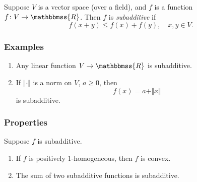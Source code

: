 \documentclass[12pt]{article}
\newcommand{\R}{\mathbbmss{R}}
\begin{document}
Suppose $V$ is a vector space (over a field), and $f$ is a 
function $f\colon V\to \R$. Then $f$ is \emph{subadditive} if
$$
   f(x+y) \le f(x) + f(y), \quad x,y\in V.
$$

\subsubsection*{Examples}
\begin{enumerate}
\item Any linear function $V\to \R$ is subadditive.
\item If $\Vert\cdot \Vert$ is a norm on $V$, $a\ge 0$, then 
$$
   f(x) = a+\Vert x \Vert
$$
is subadditive.
\end{enumerate}


\subsubsection*{Properties}
Suppose $f$ is subadditive. 
\begin{enumerate}
\item If $f$ is positively $1$-homogeneous, then $f$ is convex. 
\item The sum of two subadditive functions is subadditive.
\end{enumerate}
\end{document}
